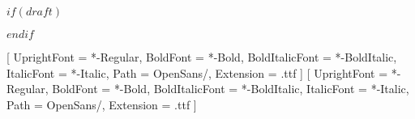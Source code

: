 \usepackage{titlepic}
\usepackage{titling}
\usepackage{graphicx}
\usepackage{fontspec}
\usepackage{placeins}
\usepackage{graphbox}
\usepackage{tikz}
\usepackage{geometry}
\usepackage{xcolor}
\usepackage{amsmath}
\usepackage[some]{background}
$if(draft)$
\usepackage[stamp,color=red!10]{draftwatermark}
$endif$
\usepackage{lipsum}
\usepackage{caption}
\usepackage{datetime}
\usepackage{xstring}
\usepackage{blindtext}
\usepackage{scrlayer-scrpage}

\setmainfont{OpenSans}[
  UprightFont = {*-Regular},
  BoldFont = {*-Bold},
  BoldItalicFont = {*-BoldItalic},
  ItalicFont = {*-Italic},
  Path = {OpenSans/},
  Extension = {.ttf}
]
\setsansfont{OpenSans}[
  UprightFont = {*-Regular},
  BoldFont = {*-Bold},
  BoldItalicFont = {*-BoldItalic},
  ItalicFont = {*-Italic},
  Path = {OpenSans/},
  Extension = {.ttf}
]

\def\getYear#1{\StrLeft{#1}{4}}
\def\getMonth#1{\StrMid{#1}{6}{7}}
\def\getDay#1{\StrRight{#1}{2}}

\def\jolimois#1{\monthname{\getMonth{#1}}}


\clearpairofpagestyles


\pagestyle{scrheadings}


\lofoot*{\thepage}
